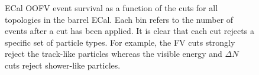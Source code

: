 \begin{figure}
\begin{minipage}{.5\linewidth}
\end{minipage}%
\begin{minipage}{.5\linewidth}
\centering
{}
\end{minipage}\par\medskip
\caption{ECal OOFV event survival as a function of the cuts for all topologies in the barrel ECal.  Each bin refers to the number of events after a cut has been applied.  It is clear that each cut rejects a specific set of particle types.  For example, the FV cuts strongly reject the track-like particles whereas the visible energy and $\Delta N$ cuts reject shower-like particles.}
\label{fig:SelOOFVEventSurvivalBarrel}
\end{figure}
